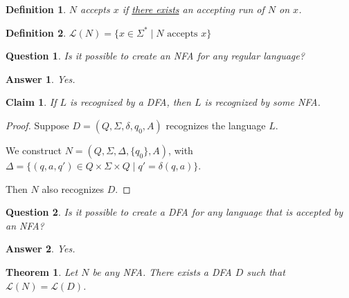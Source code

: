 \documentclass[a4paper]{article}
\newtheorem{theorem}{Theorem}[section]
\newtheorem{claim}{Claim}
\newtheorem{ans}{Answer}
\newtheorem{ques}{Question}
\newtheorem{defn}{Definition}
\newcommand{\mc}{\mathcal}
\begin{document}
\begin{defn}
    $N$ accepts $x$ if \underline{there exists} an accepting run of $N$ on $x$.
\end{defn}

\begin{defn}
    $\mc{L}(N) = \{x \in \Sigma^* \mid N \text{ accepts } x\}$
\end{defn}

\begin{ques}
    Is it possible to create an NFA for any regular language?
\end{ques}

\begin{ans}
    Yes.
\end{ans}

\begin{claim}
    If $L$ is recognized by a DFA, then $L$ is recognized by some NFA.
\end{claim}
\begin{proof}
    
    Suppose $D = (Q, \Sigma, \delta, q_0, A)$ recognizes the language $L$.
    
    We construct $N = (Q, \Sigma, \Delta, \{q_0\}, A)$, with $\Delta = \{(q, a, q') \in Q \times \Sigma \times Q \mid q' = \delta(q, a)\}$.

    Then $N$ also recognizes $D$.
\end{proof}

\begin{ques}
    Is it possible to create a DFA for any language that is accepted by an NFA?
\end{ques}

\begin{ans}
    Yes.
\end{ans}

\begin{theorem}
    Let $N$ be any NFA. There exists a DFA $D$ such that $\mc{L}(N) = \mc{L}(D)$.
\end{theorem}
\end{document}
